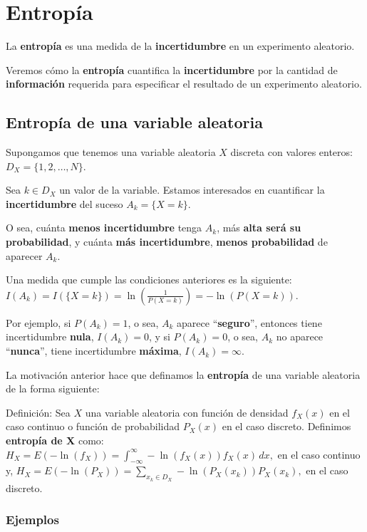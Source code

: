 \documentclass[]{book}
\begin{document}
\hypertarget{entropuxeda}{%
\section{Entropía}\label{entropuxeda}}

La \textbf{entropía} es una medida de la \textbf{incertidumbre} en un experimento aleatorio.

Veremos cómo la \textbf{entropía} cuantifica la \textbf{incertidumbre} por la cantidad de \textbf{información} requerida para especificar el resultado de un experimento aleatorio.

\hypertarget{entropuxeda-de-una-variable-aleatoria}{%
\subsection{Entropía de una variable aleatoria}\label{entropuxeda-de-una-variable-aleatoria}}

Supongamos que tenemos una variable aleatoria \(X\) discreta con valores enteros: \(D_X=\{1,2,\ldots,N\}\).

Sea \(k\in D_X\) un valor de la variable. Estamos interesados en cuantificar la \textbf{incertidumbre} del suceso \(A_k =\{X=k\}\).

O sea, cuánta \textbf{menos incertidumbre} tenga \(A_k\), más \textbf{alta será su probabilidad}, y cuánta \textbf{más incertidumbre}, \textbf{menos probabilidad} de aparecer \(A_k\).

Una medida que cumple las condiciones anteriores es la siguiente: \(I(A_k)=I(\{X=k\})=\ln\left(\frac{1}{P(X=k)}\right)=-\ln\left(P(X=k)\right).\)

Por ejemplo, si \(P(A_k)=1\), o sea, \(A_k\) aparece ``\textbf{seguro}'', entonces tiene incertidumbre \textbf{nula}, \(I(A_k)=0\), y si \(P(A_k)=0\), o sea, \(A_k\) no aparece ``\textbf{nunca}'', tiene incertidumbre \textbf{máxima}, \(I(A_k)=\infty\).

La motivación anterior hace que definamos la \textbf{entropía} de una variable aleatoria de la forma siguiente:

Definición:
Sea \(X\) una variable aleatoria con función de densidad \(f_X(x)\) en el caso continuo o función de probabilidad \(P_X(x)\) en el caso discreto. Definimos \textbf{entropía de X} como:
\(H_X = E\left(-\ln(f_X)\right)=\int_{-\infty}^\infty -\ln(f_X(x)) f_X(x)\, dx,\) en el caso continuo y,
\(H_X = E\left(-\ln(P_X)\right)=\sum_{x_k\in D_X} -\ln(P_X(x_k)) P_X(x_k),\) en el caso discreto.

\hypertarget{ejemplos-2}{%
\subsubsection{Ejemplos}\label{ejemplos-2}}
\end{document}

